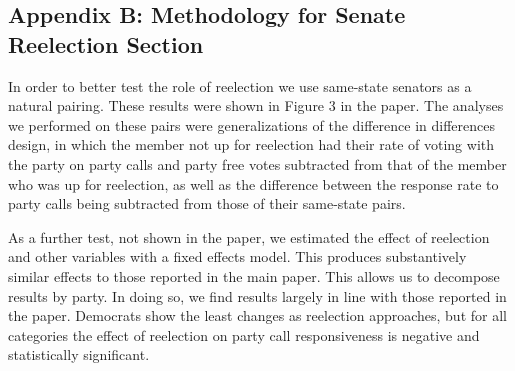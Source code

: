 \documentclass[12pt]{article}
\begin{document}
\subsection{Appendix B: Methodology for Senate Reelection Section}

In order to better test the role of reelection we use same-state senators as a natural pairing. These results were shown in Figure 3 in the paper. The analyses we performed on these pairs were generalizations of the difference in differences design, in which the member not up for reelection had their rate of voting with the party on party calls and party free votes subtracted from that of the member who was up for reelection, as well as the difference between the response rate to party calls being subtracted from those of their same-state pairs. 

As a further test, not shown in the paper, we estimated the effect of reelection and other variables with a fixed effects model. This produces substantively similar effects to those reported in the main paper. This allows us to decompose results by party. In doing so, we find results largely in line with those reported in the paper. Democrats show the least changes as reelection approaches, but for all categories the effect of reelection on party call responsiveness is negative and statistically significant.
\end{document}
